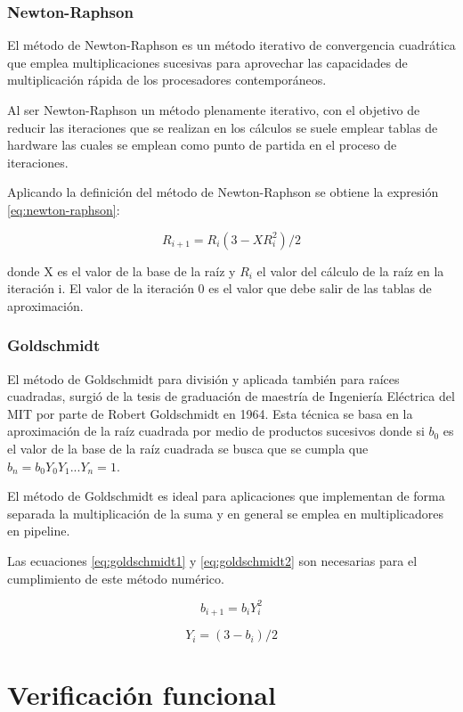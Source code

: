 \subsubsection{Newton-Raphson}

El método de Newton-Raphson es un método iterativo de convergencia cuadrática que emplea multiplicaciones sucesivas para aprovechar las capacidades de multiplicación rápida de los procesadores contemporáneos. 

Al ser Newton-Raphson un método plenamente iterativo, con el objetivo de reducir las iteraciones que se realizan en los cálculos se suele emplear tablas de hardware las cuales se emplean como punto de partida en el proceso de iteraciones.

Aplicando la definición del método de Newton-Raphson se obtiene la expresión \eqref{eq:newton-raphson}:

\begin{equation}
\label{eq:newton-raphson}
  R_{i+1}=R_{i}(3-XR_{i}^{2})/2
\end{equation}

donde X es el valor de la base de la raíz y $R_{i}$ el valor del cálculo de la raíz en la iteración i. El valor de la iteración 0 es el valor que debe salir de las tablas de aproximación.


\subsubsection{Goldschmidt}

El método de Goldschmidt para división y aplicada también para raíces cuadradas, surgió de la tesis de graduación de maestría de Ingeniería Eléctrica del MIT por parte de Robert Goldschmidt en 1964. Esta técnica se basa en la aproximación de la raíz cuadrada por medio de productos sucesivos donde si $b_{0}$ es el valor de la base de la raíz cuadrada se busca que se cumpla que $b_{n}=b_{0}Y_{0}Y_{1}...Y_{n}=1$.

El método de Goldschmidt es ideal para aplicaciones que implementan de forma separada la multiplicación de la suma y en general se emplea en multiplicadores en pipeline.

Las ecuaciones \eqref{eq:goldschmidt1} y \eqref{eq:goldschmidt2} son necesarias para el cumplimiento de este método numérico.

\begin{equation}
\label{eq:goldschmidt1}
  b_{i+1}=b_{i}Y_{i}^{2}
\end{equation}

\begin{equation}
\label{eq:goldschmidt2}
  Y_{i}=(3-b_{i})/2
\end{equation}
  




\section{Verificación funcional}
